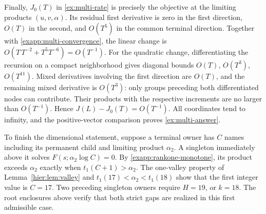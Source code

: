 Finally, \(J_0(T)\) in \eqref{ex:multi-rate} is precisely the
objective at the limiting products \((u,v,\alpha)\).  Its residual
first derivative is zero in the first direction, \(O(T)\) in the
second, and \(O(T^5)\) in the common terminal direction.
Together with \eqref{exapp:multi-convergence}, the linear change is
\(O(T\,T^{-2}+T^5T^{-6})=O(T^{-1})\).
For the quadratic change, differentiating the recursion on a compact
neighborhood gives diagonal bounds \(O(T)\), \(O(T^3)\),
\(O(T^{11})\).  Mixed derivatives involving the first direction
are \(O(T)\), and the remaining mixed derivative is \(O(T^3)\):
only groups preceding both differentiated nodes can contribute.
Their products with the respective increments are no larger than
\(O(T^{-1})\).  Hence \(J(L)-J_0(T)=O(T^{-1})\).
All coordinates tend to infinity, and the positive-vector comparison
proves \eqref{ex:multi-answer}.

To finish the dimensional statement, suppose a terminal owner has
\(C\) names including its permanent child and limiting product
\(\alpha_2\).  A singleton immediately above it solves
\(F(s;\alpha_2\log C)=0\).  By
\eqref{exapp:rankone-monotone}, its product exceeds \(\alpha_2\)
exactly when \(t_1(C+1)>\alpha_2\).  The one-valley property
of Lemma~\ref{hier:lem:valley} and
\(t_1(17)<\alpha_2<t_1(18)\) show that the first integer value
is \(C=17\).  Two preceding singleton owners require
\(H=19\), or \(k=18\).  The root enclosures above verify that
both strict gaps are realized in this first admissible case.
